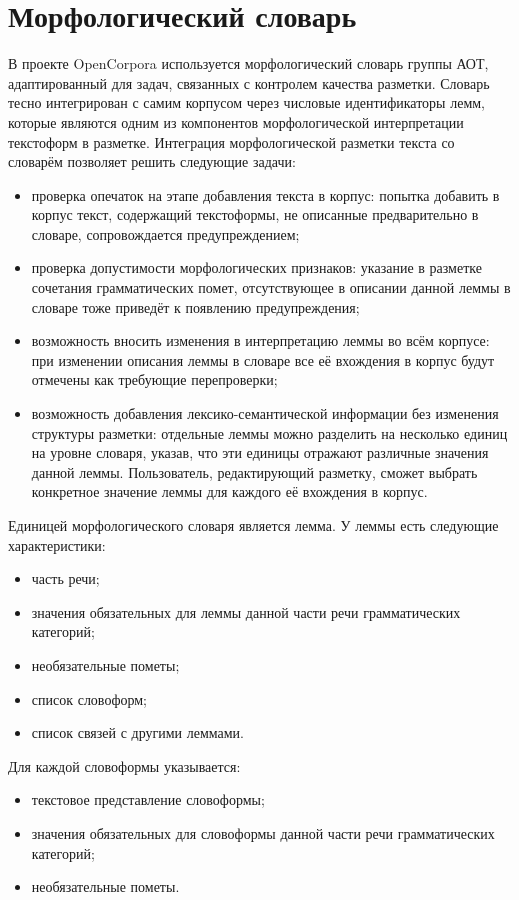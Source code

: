 \documentclass[a4paper]{article}
\begin{document}
\section{Морфологический словарь}
В проекте OpenCorpora используется морфологический словарь группы АОТ\cite{aot}, адаптированный для задач, связанных с контролем качества разметки. Словарь тесно интегрирован с самим корпусом через числовые идентификаторы лемм, которые являются одним из компонентов морфологической интерпретации текстоформ в разметке. Интеграция морфологической разметки текста со словарём позволяет решить следующие задачи:
\begin{itemize}
\item проверка опечаток на этапе добавления текста в корпус: попытка добавить в корпус текст, содержащий текстоформы, не описанные предварительно в словаре, сопровождается предупреждением;
\item проверка допустимости морфологических признаков: указание в разметке сочетания грамматических помет, отсутствующее в описании данной леммы в словаре тоже приведёт к появлению предупреждения;
\item возможность вносить изменения в интерпретацию леммы во всём корпусе: при изменении описания леммы в словаре все её вхождения в корпус будут отмечены как требующие перепроверки;
\item возможность добавления лексико-семантической информации без изменения структуры разметки: отдельные леммы можно разделить на несколько единиц на уровне словаря, указав, что эти единицы отражают различные значения данной леммы. Пользователь, редактирующий разметку, сможет выбрать конкретное значение леммы для каждого её вхождения в корпус.
\end{itemize}

Единицей морфологического словаря является лемма. У леммы есть следующие характеристики:
\begin{itemize}
\item часть речи;
\item значения обязательных для леммы данной части речи грамматических категорий;
\item необязательные пометы;
\item список словоформ;
\item список связей с другими леммами.
\end{itemize}

Для каждой словоформы указывается:
\begin{itemize}
\item текстовое представление словоформы;
\item значения обязательных для словоформы данной части речи грамматических категорий;
\item необязательные пометы.
\end{itemize}
\end{document}
